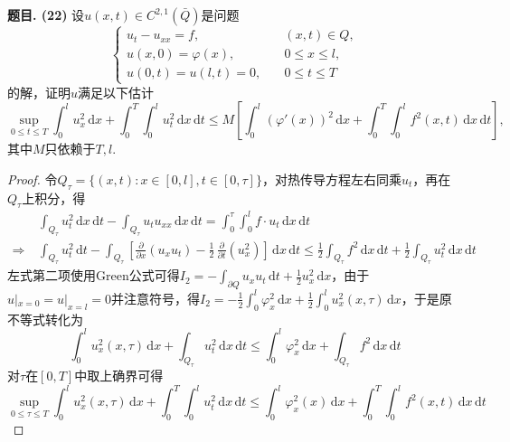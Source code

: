 \documentclass[12pt, a4paper, oneside]{ctexart}
\newcounter{problem}  %
\newenvironment{problem}[1][]{\stepcounter{problem}\par\noindent\textbf{题目\arabic{problem}. #1}}{\smallskip\par}
\let\leq=\leqslant %
\def\d{\mathrm{d}}          %
\begin{document}
\begin{problem}[(22)]
    设$u(x,t)\in C^{2,1}(\bar{Q})$是问题
    \begin{equation*}
        \begin{cases}
            u_t-u_{xx} = f,&\quad (x,t)\in Q,\\
            u(x,0) = \varphi(x),&\quad 0\leq x\leq l,\\
            u(0,t)=u(l,t) = 0,&\quad 0\leq t\leq T
        \end{cases}
    \end{equation*}
    的解，证明$u$满足以下估计
    \begin{equation*}
        \sup_{0\leq t\leq T}\int_0^lu_x^2\,\d x+\int_0^T\int_0^lu_t^2\,\d x\,\d t\leq M\left[\int_0^l(\varphi'(x))^2\,\d x+\int_0^T\int_0^lf^2(x,t)\,\d x\,\d t\right],
    \end{equation*}
    其中$M$只依赖于$T,l$.
\end{problem}
\begin{proof}
    令$Q_\tau = \{(x,t):x\in[0,l], t\in [0,\tau]\}$，对热传导方程左右同乘$u_t$，再在$Q_\tau$上积分，得
    \begin{align*}
        &\ \int_{Q_\tau}u_t^2\,\d x\,\d t - \int_{Q_\tau}u_tu_{xx}\,\d x\,\d t = \int_0^\tau\int_0^lf\cdot u_t\,\d x\,\d t\\
        \Rightarrow&\ \int_{Q_\tau}u_t^2\,\d t - \int_{Q_\tau}\left[\frac{\partial}{\partial x}(u_xu_t)-\frac{1}{2}\,\frac{\partial}{\partial t}(u_x^2)\right]\,\d x\,\d t\leq \frac{1}{2}\int_{Q_\tau}f^2\,\d x\,\d t + \frac{1}{2}\int_{Q_\tau}u_t^2\,\d x\,\d t
    \end{align*}
    左式第二项使用Green公式可得$I_2 = -\int_{\partial Q}u_xu_t\,\d t + \frac{1}{2}u_x^2\,\d x$，由于$u|_{x=0} = u|_{x=l} = 0$并注意符号，得$I_2 = -\frac{1}{2}\int_0^l\varphi_x^2\,\d x+\frac{1}{2}\int_0^lu_x^2(x,\tau)\,\d x$，于是原不等式转化为
    \begin{equation*}
        \int_0^lu_x^2(x,\tau)\,\d x + \int_{Q_\tau}u_t^2\,\d x\,\d t \leq \int_0^l\varphi_x^2\,\d x + \int_{Q_\tau}f^2\,\d x\,\d t
    \end{equation*}
    对$\tau$在$[0,T]$中取上确界可得
    \begin{equation*}
        \sup_{0\leq \tau\leq T}\int_0^lu_x^2(x,\tau)\,\d x+\int_0^T\int_0^lu_t^2\,\d x\,\d t\leq \int_0^l\varphi_x^2(x)\,\d x + \int_0^T\int_0^lf^2(x,t)\,\d x\,\d t
    \end{equation*}
\end{proof}
\end{document}
